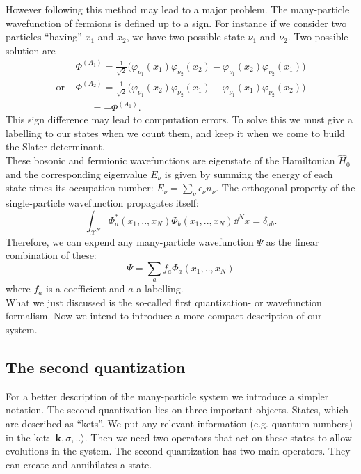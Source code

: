 \documentclass[../main.tex]{subfile}
\begin{document}
However following this method may lead to a major problem. The many-particle wavefunction of fermions is defined up to a sign. For instance if we consider
two particles ``having'' $x_1$ and $x_2$, we have two possible state $\nu_1$ and $\nu_2$. Two possible solution are
\begin{align*}
    &\Phi^{(A_1)} = \frac{1}{\sqrt{2}} \bigl(\varphi_{\nu_1} (x_1)\varphi_{\nu_2} (x_2) - \varphi_{\nu_1} (x_2)\varphi_{\nu_2} (x_1) \bigr)\\
    \text{or~} &\Phi^{(A_2)} = \frac{1}{\sqrt{2}} \bigl(\varphi_{\nu_1} (x_2)\varphi_{\nu_2}(x_1) - \varphi_{\nu_1} (x_1)\varphi_{\nu_2} (x_2)\bigr)\\
    &~~~~~~~=-\Phi^{(A_1)}.
\end{align*}
This sign difference may lead to computation errors. To solve this we must give a labelling to our states when we count them, and keep it when we 
come to build the Slater determinant.\\

These bosonic and fermionic wavefunctions are eigenstate of the Hamiltonian $\hat{H}_0$ and the corresponding eigenvalue $E_{\nu}$
is given by summing the energy of each state times its occupation number: $E_{\nu} = \sum_{\nu} \epsilon_{\nu} n_{\nu}$.
The orthogonal property of the single-particle wavefunction propagates itself:
\[
    \int_{\mathcal{X}^N} \Phi_a^{\ast}(x_1,..,x_N) \Phi_b(x_1,..,x_N) \dd^N x = \delta_{ab}.
\]
Therefore, we can expend any many-particle wavefunction $\Psi$ as the linear combination of these:
\[
    \Psi = \sum_a f_a \Phi_a(x_1,..,x_N)
\]
where $f_a$ is a coefficient and $a$ a labelling.\\

What we just discussed is the so-called first quantization- or wavefunction formalism. Now we intend to introduce a more compact description of our system. 

\subsection{The second quantization}
For a better description of the many-particle system we introduce a simpler notation. The second quantization lies on three important objects. 
States, which are described as ``kets''. We put any relevant information (e.g. quantum numbers) in the ket: $|\bm{k}, \sigma,..\rangle$. 
Then we need two operators that act on these states to allow evolutions in the system. 
The second quantization has two main operators. They can create and annihilates a state.\\
\end{document}
